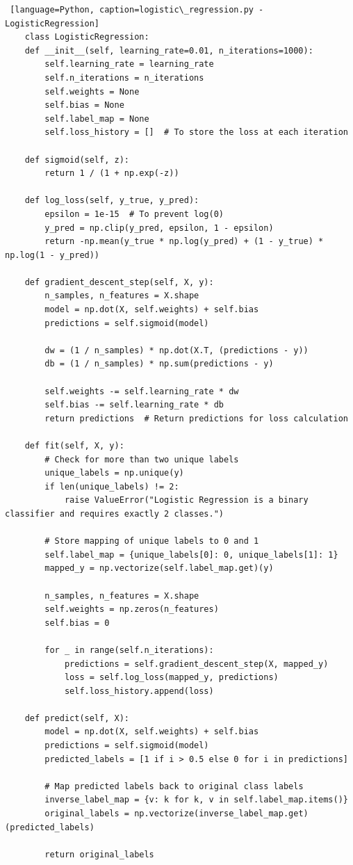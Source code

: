 \documentclass[letterpaper,10pt]{article}
\begin{document}
\begin{lstlisting} [language=Python, caption=logistic\_regression.py - LogisticRegression] 
    class LogisticRegression:
    def __init__(self, learning_rate=0.01, n_iterations=1000):
        self.learning_rate = learning_rate
        self.n_iterations = n_iterations
        self.weights = None
        self.bias = None
        self.label_map = None
        self.loss_history = []  # To store the loss at each iteration

    def sigmoid(self, z):
        return 1 / (1 + np.exp(-z))
    
    def log_loss(self, y_true, y_pred):
        epsilon = 1e-15  # To prevent log(0)
        y_pred = np.clip(y_pred, epsilon, 1 - epsilon)
        return -np.mean(y_true * np.log(y_pred) + (1 - y_true) * np.log(1 - y_pred))
    
    def gradient_descent_step(self, X, y):
        n_samples, n_features = X.shape
        model = np.dot(X, self.weights) + self.bias
        predictions = self.sigmoid(model)

        dw = (1 / n_samples) * np.dot(X.T, (predictions - y))
        db = (1 / n_samples) * np.sum(predictions - y)

        self.weights -= self.learning_rate * dw
        self.bias -= self.learning_rate * db
        return predictions  # Return predictions for loss calculation

    def fit(self, X, y):
        # Check for more than two unique labels
        unique_labels = np.unique(y)
        if len(unique_labels) != 2:
            raise ValueError("Logistic Regression is a binary classifier and requires exactly 2 classes.")
        
        # Store mapping of unique labels to 0 and 1
        self.label_map = {unique_labels[0]: 0, unique_labels[1]: 1}
        mapped_y = np.vectorize(self.label_map.get)(y)
        
        n_samples, n_features = X.shape
        self.weights = np.zeros(n_features)
        self.bias = 0

        for _ in range(self.n_iterations):
            predictions = self.gradient_descent_step(X, mapped_y)
            loss = self.log_loss(mapped_y, predictions)
            self.loss_history.append(loss)

    def predict(self, X):
        model = np.dot(X, self.weights) + self.bias
        predictions = self.sigmoid(model)
        predicted_labels = [1 if i > 0.5 else 0 for i in predictions]
        
        # Map predicted labels back to original class labels
        inverse_label_map = {v: k for k, v in self.label_map.items()}
        original_labels = np.vectorize(inverse_label_map.get)(predicted_labels)
        
        return original_labels

\end{lstlisting}
\end{document}
